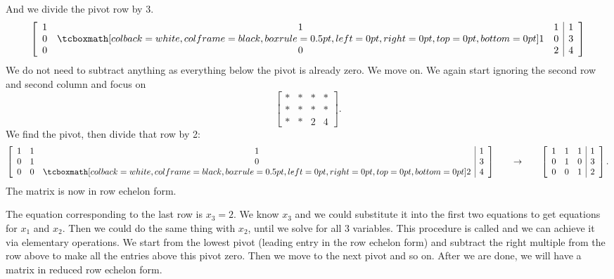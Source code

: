 And we divide the pivot row by 3.
\begin{equation*}
\left[
\begin{array}{ccc|c}
1 & 1 & 1 & 1 \\
0 & \mybxsm{1} & 0 & 3 \\
0 & 0 & 2 & 4
\end{array}
\right]
\end{equation*}
We do not need to subtract anything as everything below the pivot is already
zero.  We move on.  We again start ignoring the second row and second
column and focus on
\begin{equation*}
\left[
\begin{array}{ccc|c}
* & * & * & * \\
* & * & * & * \\
* & * & 2 & 4
\end{array}
\right] .
\end{equation*}
We find the pivot, then divide that row by 2:
\begin{equation*}
\left[
\begin{array}{ccc|c}
1 & 1 & 1 & 1 \\
0 & 1 & 0 & 3 \\
0 & 0 & \mybxsm{2} & 4
\end{array}
\right]
\qquad \to \qquad
\left[
\begin{array}{ccc|c}
1 & 1 & 1 & 1 \\
0 & 1 & 0 & 3 \\
0 & 0 & 1 & 2
\end{array}
\right] .
\end{equation*}
The matrix is now in row echelon form.

The equation corresponding to the last row is $x_3 = 2$.
We know $x_3$ and we
could substitute it into the first two equations to get equations for
$x_1$ and $x_2$.  Then we could do the same thing with $x_2$, until we solve
for all 3 variables.  This procedure is called
\emph{} and we can achieve it via elementary
operations.
We start from the lowest pivot (leading entry in the row
echelon form) and subtract the right multiple from the row above to
make all the entries above this pivot zero.
Then we move to the next pivot and so on.
After we are done, we will have a matrix in reduced row echelon form.

